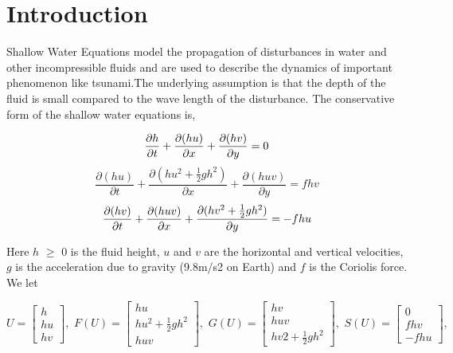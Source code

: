 
\section{Introduction}
\par

Shallow Water Equations model the propagation of disturbances in water and other incompressible fluids and are used to describe the 
dynamics of important phenomenon like tsunami.The underlying assumption is that the depth of the fluid is small compared to 
the wave length of the disturbance. The conservative form of the shallow water equations is,

\begin{equation}\label{eqn:1}
{\frac{\partial h}{\partial t} + \frac{\partial (hu)}{\partial x} + \frac{\partial (hv)}{\partial y} = 0 } \notag
\end{equation}
\begin{equation}
{\frac{\partial (hu)}{\partial t} + \frac{\partial (hu^2 + \frac{1}{2} gh ^2)}{\partial x} + \frac{\partial (huv)}{\partial y} = fhv }
\end{equation}
\begin{equation}
{\frac{\partial (hv)}{\partial t} + \frac{\partial (huv)}{\partial x}+\frac{\partial (hv^2 + \frac{1}{2} gh ^2)}{\partial y}=-fhu } \notag
\end{equation}

Here $h$ $\ge$ 0 is the fluid height, $u$ and $v$ are the horizontal and vertical velocities, $g$ is the acceleration due to gravity (9.8m/s2 on Earth) 
and $f$ is the Coriolis force. We let


\[U = \begin{bmatrix} h \\ hu \\ hv\end{bmatrix},\,\, F(U) = \begin{bmatrix} hu \\ hu^2 +  \frac{1}{2} gh^2 \\ huv \end{bmatrix},\,\,
G(U) = \begin{bmatrix} hv \\ huv \\ hv2 +  \frac{1}{2} gh^2 \end{bmatrix},\,\, 
S(U) = \begin{bmatrix} 0 \\ fhv \\ -fhu \end{bmatrix}, \]


